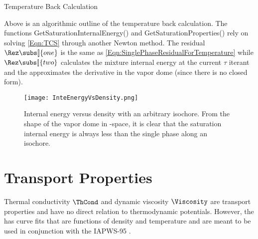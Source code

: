 \begin{algorithm}[t]
    \caption{Temperature Back Calculation}
    \label{Algo:TemperatureBackCalc}
\end{algorithm}

Above is an algorithmic outline of the temperature back calculation.  
The functions GetSaturationInternalEnergy() and GetSaturationProperties() rely on solving \cref{Eqn:TCS} 
through another Newton method.
The residual $\Rez\subs[\!]{one}$ is the same as \cref{Eqn:SinglePhaseResidualForTemperature} 
while $\Rez\subs[\!]{two}$ calculates the mixture internal energy at the current $\tau$ iterant 
and the approximates the derivative in the vapor dome (since there is no closed form).

\begin{figure}[b]%
    \begin{center}
        \caption[Internal energy versus density with an arbitrary isochore]{ 
                    Internal energy versus density with an arbitrary isochore.  
                    From the shape of the vapor dome in \Density-\IntEnergy space, it is clear that the saturation internal energy 
                    is always less than the single phase along an isochore.
        }%
        \label{Fig:IntERhoDiagram}%
        \texttt{[image: InteEnergyVsDensity.png]}%
    \end{center}
\end{figure}

\cleardoublepage
\section{Transport Properties}\label{Section:TransportProps}
Thermal conductivity $\ThCond$ and dynamic viscosity $\Viscosity$ are transport properties and have no direct relation to thermodynamic potentials.
However, the  has curve fits that are functions of density and temperature and are meant to be used in conjunction with the IAPWS-95  \cite{iapws_release_2008,iapws_release_2011}.


